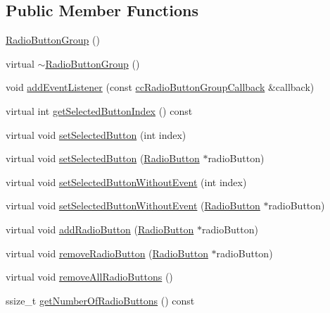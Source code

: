 \subsection*{Public Member Functions}
\begin{DoxyCompactItemize}
\item 
\hyperlink{classui_1_1RadioButtonGroup_a68fedea375f325dcb934861768945c21}{Radio\+Button\+Group} ()
\item 
virtual \hyperlink{classui_1_1RadioButtonGroup_ab2f7282bda16ffdf09b0dcb08abd4485}{$\sim$\+Radio\+Button\+Group} ()
\item 
void \hyperlink{classui_1_1RadioButtonGroup_a22663b5cf32d32749ced9005888e937f}{add\+Event\+Listener} (const \hyperlink{classui_1_1RadioButtonGroup_a8385f08613e843c5977252ed03c37e22}{cc\+Radio\+Button\+Group\+Callback} \&callback)
\item 
virtual int \hyperlink{classui_1_1RadioButtonGroup_a918a8c5756b2e2ad02ddb8e87cb16f28}{get\+Selected\+Button\+Index} () const
\item 
virtual void \hyperlink{classui_1_1RadioButtonGroup_aac8fb7403ae09cf11e9e830ad86ad721}{set\+Selected\+Button} (int index)
\item 
virtual void \hyperlink{classui_1_1RadioButtonGroup_a72720e5dfe8a512dd39e0fd48e64e48f}{set\+Selected\+Button} (\hyperlink{classui_1_1RadioButton}{Radio\+Button} $\ast$radio\+Button)
\item 
virtual void \hyperlink{classui_1_1RadioButtonGroup_a27e6a20a27f2199ec0b9663bc2261950}{set\+Selected\+Button\+Without\+Event} (int index)
\item 
virtual void \hyperlink{classui_1_1RadioButtonGroup_a5232389d8cddeecbb36ae054a86a656f}{set\+Selected\+Button\+Without\+Event} (\hyperlink{classui_1_1RadioButton}{Radio\+Button} $\ast$radio\+Button)
\item 
virtual void \hyperlink{classui_1_1RadioButtonGroup_ae9b744703cc5ca6fbb404c96fb8d040d}{add\+Radio\+Button} (\hyperlink{classui_1_1RadioButton}{Radio\+Button} $\ast$radio\+Button)
\item 
virtual void \hyperlink{classui_1_1RadioButtonGroup_a666b7900202f97a12652587d914aa0b6}{remove\+Radio\+Button} (\hyperlink{classui_1_1RadioButton}{Radio\+Button} $\ast$radio\+Button)
\item 
virtual void \hyperlink{classui_1_1RadioButtonGroup_a9408962c0d9e25cec34b69454aac127e}{remove\+All\+Radio\+Buttons} ()
\item 
ssize\+\_\+t \hyperlink{classui_1_1RadioButtonGroup_a673d0fac47fbe688d10ffa361d8ae980}{get\+Number\+Of\+Radio\+Buttons} () const

\end{DoxyCompactItemize}
